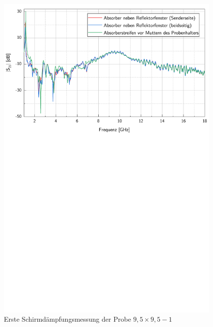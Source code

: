\begin{figure}[ht]
    \centering
    \includegraphics[page = 4, width = .99\textwidth, trim = 0cm 14.3cm 0cm 0cm, clip]{Abbildungen/Kapitel4/Messergebnisse/9k5x9k5-1.pdf}
    \caption{Erste Schirmdämpfungsmessung der Probe $9,5\times9,5-1$}
    \label{fig:4_erste_Messung}
\end{figure}


